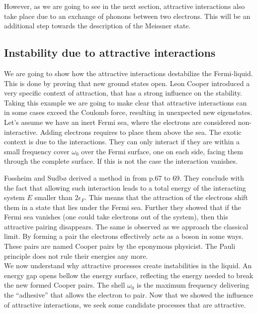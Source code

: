 \documentclass[../main.tex]{subfile}
\begin{document}
However, as we are going to see in the next section, attractive interactions also take place due to an exchange of phonons between two electrons. This will be 
an additional step towards the description of the Meissner state.

\subsection{Instability due to attractive interactions}
We are going to show how the attractive interactions destabilize the Fermi-liquid. This is done by proving
that new ground states open. Leon Cooper introduced a very specific context of attraction, that has a strong influence on the stability. Taking this example we are going
to make clear that attractive interactions can in some cases exceed the Coulomb force, resulting in unexpected new eigenstates.\\

Let's assume we have an inert Fermi sea, where the electrons are considered non-interactive. Adding electrons requires to place them
above the sea. The exotic context is due to the interactions. They can only interact if they are within a small frequency cover $\omega_0$
over the Fermi surface, one on each side, facing them through the complete surface. If this is not the case the interaction vanishes.

Fossheim and Sudbø derived a method in \cite{FossheimSudbo2004} from p.67 to 69. They conclude with the fact that allowing such
interaction leads to a total energy of the interacting system $E$ smaller than $2 \epsilon_{F}$. This means that the attraction of the electrons
shift them in a state that lies under the Fermi sea. Further they showed that if the Fermi sea vanishes (one could take electrons out of the system), 
then this attractive pairing disappears. The same is observed as we approach the classical limit.
By forming a pair the electrons effectively acts as a boson in some ways. These pairs are named Cooper pairs by the eponymous physicist.
The Pauli principle does not rule their energies any more.\\

We now understand why attractive processes create instabilities in the liquid. An energy gap opens bellow the energy surface,
reflecting the energy needed to break the new formed Cooper pairs. The shell $\omega_0$ is the maximum frequency delivering
the ``adhesive'' that allows the electron to pair.
Now that we showed the influence of attractive interactions, we seek some candidate processes that are attractive.
\end{document}
